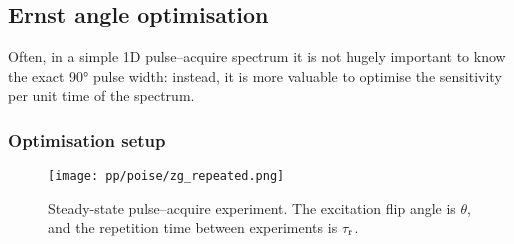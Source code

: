 \subsection{Ernst angle optimisation}
\label{subsec:poise__ernst}

Often, in a simple 1D pulse--acquire spectrum it is not hugely important to know the exact \ang{90} pulse width: instead, it is more valuable to optimise the sensitivity per unit time of the spectrum.

\subsubsection{Optimisation setup}

\begin{figure}[htb]
    \centering
    \texttt{[image: pp/poise/zg\_repeated.png]}
    \caption[Steady-state pulse--acquire experiment]{Steady-state pulse--acquire experiment. The excitation flip angle is $\theta$, and the repetition time between experiments is $\tau_\mathrm{r}$.}
    \label{fig:zg_ernst}
\end{figure}

